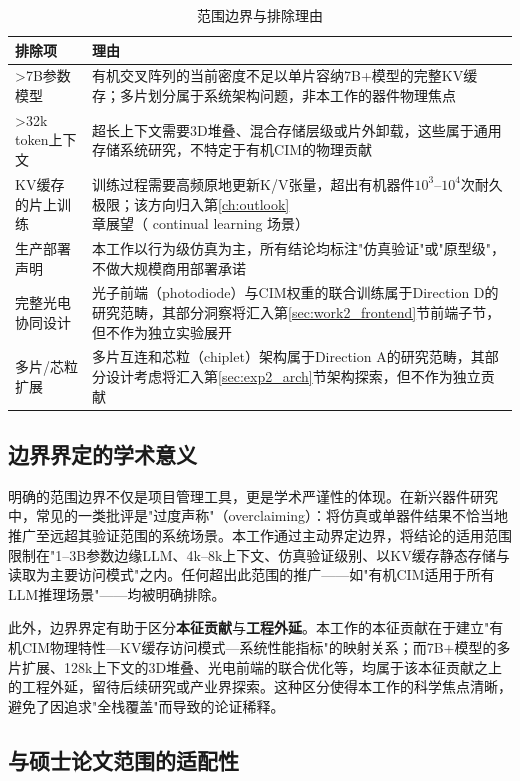 \begin{table}[htbp]
\centering
\caption{范围边界与排除理由}
\label{tab:boundaries}
\begin{tabular}{lp{8cm}}
\toprule
排除项 & 理由 \\
\midrule
>7B参数模型 & 有机交叉阵列的当前密度不足以单片容纳7B+模型的完整KV缓存；多片划分属于系统架构问题，非本工作的器件物理焦点 \\
>32k token上下文 & 超长上下文需要3D堆叠、混合存储层级或片外卸载，这些属于通用存储系统研究，不特定于有机CIM的物理贡献 \\
KV缓存的片上训练 & 训练过程需要高频原地更新K/V张量，超出有机器件$10^3$–$10^4$次耐久极限；该方向归入第\ref{ch:outlook}章展望（ continual learning 场景） \\
生产部署声明 & 本工作以行为级仿真为主，所有结论均标注"仿真验证"或"原型级"，不做大规模商用部署承诺 \\
完整光电协同设计 & 光子前端（photodiode）与CIM权重的联合训练属于Direction D的研究范畴，其部分洞察将汇入第\ref{sec:work2_frontend}节前端子节，但不作为独立实验展开 \\
多片/芯粒扩展 & 多片互连和芯粒（chiplet）架构属于Direction A的研究范畴，其部分设计考虑将汇入第\ref{sec:exp2_arch}节架构探索，但不作为独立贡献 \\
\bottomrule
\end{tabular}
\end{table}

\subsection{边界界定的学术意义}

明确的范围边界不仅是项目管理工具，更是学术严谨性的体现。在新兴器件研究中，常见的一类批评是"过度声称"（overclaiming）：将仿真或单器件结果不恰当地推广至远超其验证范围的系统场景。本工作通过主动界定边界，将结论的适用范围限制在"1–3B参数边缘LLM、4k–8k上下文、仿真验证级别、以KV缓存静态存储与读取为主要访问模式"之内。任何超出此范围的推广——如"有机CIM适用于所有LLM推理场景"——均被明确排除。

此外，边界界定有助于区分\textbf{本征贡献}与\textbf{工程外延}。本工作的本征贡献在于建立"有机CIM物理特性—KV缓存访问模式—系统性能指标"的映射关系；而7B+模型的多片扩展、128k上下文的3D堆叠、光电前端的联合优化等，均属于该本征贡献之上的工程外延，留待后续研究或产业界探索。这种区分使得本工作的科学焦点清晰，避免了因追求"全栈覆盖"而导致的论证稀释。

\subsection{与硕士论文范围的适配性}

